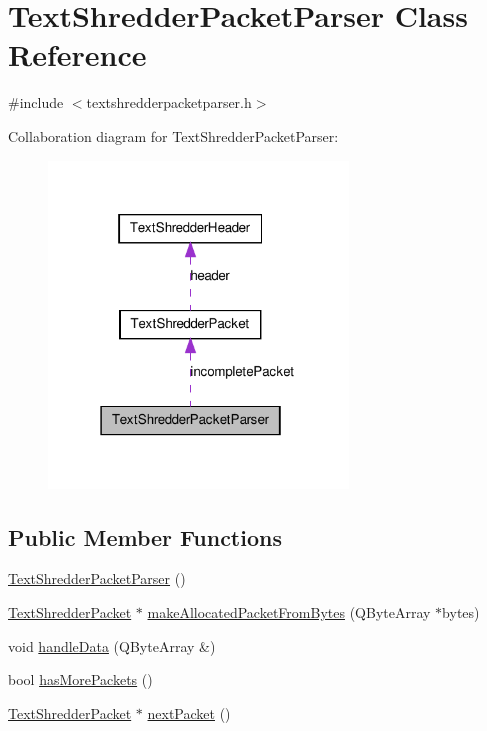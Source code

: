 \hypertarget{class_text_shredder_packet_parser}{
\section{TextShredderPacketParser Class Reference}
\label{class_text_shredder_packet_parser}
}


{\ttfamily \#include $<$textshredderpacketparser.h$>$}



Collaboration diagram for TextShredderPacketParser:\nopagebreak
\begin{figure}[H]
\begin{center}
\leavevmode
\includegraphics[width=226pt]{class_text_shredder_packet_parser__coll__graph}
\end{center}
\end{figure}
\subsection*{Public Member Functions}
\begin{DoxyCompactItemize}
\item 
\hyperlink{class_text_shredder_packet_parser_a0573b7801a3c6358cdf419d551893779}{TextShredderPacketParser} ()
\item 
\hyperlink{class_text_shredder_packet}{TextShredderPacket} $\ast$ \hyperlink{class_text_shredder_packet_parser_a7bba96646712ea2661f46d14a33eb9db}{makeAllocatedPacketFromBytes} (QByteArray $\ast$bytes)
\item 
void \hyperlink{class_text_shredder_packet_parser_a332ffaa1da7aa61fc2e5fe3cbed15d5a}{handleData} (QByteArray \&)
\item 
bool \hyperlink{class_text_shredder_packet_parser_ae85e856e84575c9dd6f2eded008f76db}{hasMorePackets} ()
\item 
\hyperlink{class_text_shredder_packet}{TextShredderPacket} $\ast$ \hyperlink{class_text_shredder_packet_parser_ac1864046c4e91d749add7537a4c4c83b}{nextPacket} ()
\end{DoxyCompactItemize}


